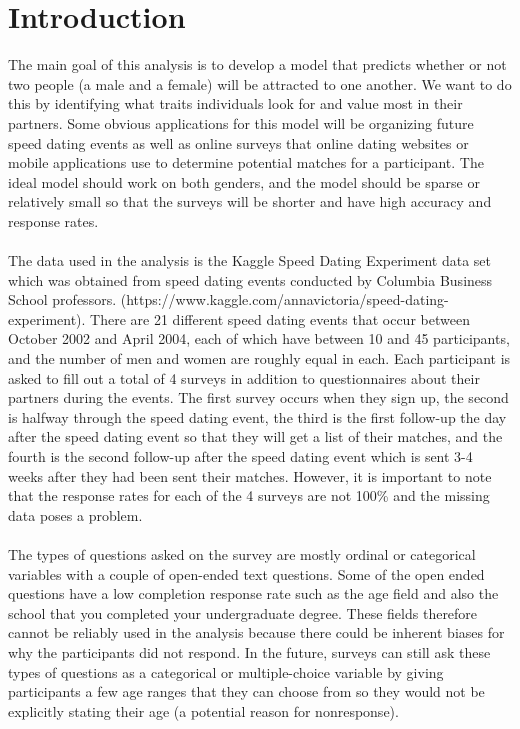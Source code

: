 \documentclass{article}
\begin{document}
\section{Introduction}
The main goal of this analysis is to develop a model that predicts whether or not two people (a male and a female) will be attracted to one another.  We want to do this by identifying what traits individuals look for and value most in their partners. Some obvious applications for this model will be organizing future speed dating events as well as online surveys that online dating websites or mobile applications use to determine potential matches for a participant. The ideal model should work on both genders, and the model should be sparse or relatively small so that the surveys will be shorter and have high accuracy and response rates.\\
\null\\
The data used in the analysis is the Kaggle Speed Dating Experiment data set which was obtained from speed dating events conducted by Columbia Business School professors.  (https://www.kaggle.com/annavictoria/speed-dating-experiment). There are 21 different speed dating events that occur between October 2002 and April 2004, each of which have between 10 and 45 participants, and the number of men and women are roughly equal in each.  Each participant is asked to fill out a total of 4 surveys in addition to questionnaires about their partners during the events.  The first survey occurs when they sign up, the second is halfway through the speed dating event, the third is the first follow-up the day after the speed dating event so that they will get a list of their matches, and the fourth is the second follow-up after the speed dating event which is sent 3-4 weeks after they had been sent their matches. However, it is important to note that the response rates for each of the 4 surveys are not 100\% and the missing data poses a problem.\\
\null\\
The types of questions asked on the survey are mostly ordinal or categorical variables with a couple of open-ended text questions.  Some of the open ended questions have a low completion response rate such as the age field and also the school that you completed your undergraduate degree.  These fields therefore cannot be reliably used in the analysis because there could be inherent biases for why the participants did not respond. In the future, surveys can still ask these types of questions as a categorical or multiple-choice variable by giving participants a few age ranges that they can choose from so they would not be explicitly stating their age (a potential reason for nonresponse). 
%
\end{document}
